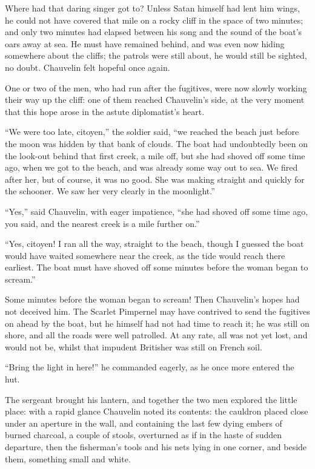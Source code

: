 \documentclass[paper=a5,BCOR=7mm,twoside,DIV=calc,12pt,usegeometry,chapterprefix,endperiod,headings=big]{scrbook}
\begin{document}
Where had that daring singer got to? Unless Satan himself had lent him wings, he could not have covered that mile on a rocky cliff in the space of two minutes; and only two minutes had elapsed between his song and the sound of the boat's oars away at sea. He must have remained behind, and was even now hiding somewhere about the cliffs; the patrols were still about, he would still be sighted, no doubt. Chauvelin felt hopeful once again.

One or two of the men, who had run after the fugitives, were now slowly working their way up the cliff: one of them reached Chauvelin's side, at the very moment that this hope arose in the astute diplomatist's heart.

\enquote{We were too late, citoyen,} the soldier said, \enquote{we reached the beach just before the moon was hidden by that bank of clouds. The boat had undoubtedly been on the look-out behind that first creek, a mile off, but she had shoved off some time ago, when we got to the beach, and was already some way out to sea. We fired after her, but of course, it was no good. She was making straight and quickly for the schooner. We saw her very clearly in the moonlight.}

\enquote{Yes,} said Chauvelin, with eager impatience, \enquote{she had shoved off some time ago, you said, and the nearest creek is a mile further on.}

\enquote{Yes, citoyen! I ran all the way, straight to the beach, though I guessed the boat would have waited somewhere near the creek, as the tide would reach there earliest. The boat must have shoved off some minutes before the woman began to scream.}

Some minutes before the woman began to scream! Then Chauvelin's hopes had not deceived him. The Scarlet Pimpernel may have contrived to send the fugitives on ahead by the boat, but he himself had not had time to reach it; he was still on shore, and all the roads were well patrolled. At any rate, all was not yet lost, and would not be, whilst that impudent Britisher was still on French soil.

\enquote{Bring the light in here!} he commanded eagerly, as he once more entered the hut.

The sergeant brought his lantern, and together the two men explored the little place: with a rapid glance Chauvelin noted its contents: the cauldron placed close under an aperture in the wall, and containing the last few dying embers of burned charcoal, a couple of stools, overturned as if in the haste of sudden departure, then the fisherman's tools and his nets lying in one corner, and beside them, something small and white.
\end{document}
